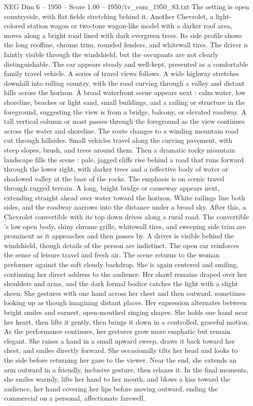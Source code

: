 \begin{textsample}{NEG Dim 6 – 1950 – Score 1.00 – 1950/tv\_com\_1950\_83.txt}
The setting is open countryside, with flat fields stretching behind it.
Another Chevrolet, a light-colored station wagon or two-tone wagon-like model with a darker roof area, moves along a bright road lined with dark evergreen trees.
Its side profile shows the long roofline, chrome trim, rounded fenders, and whitewall tires.
The driver is faintly visible through the windshield, but the occupants are not clearly distinguishable.
The car appears steady and well-kept, presented as a comfortable family travel vehicle.
A series of travel views follows.
A wide highway stretches downhill into rolling country, with the road curving through a valley and distant hills across the horizon.
A broad waterfront scene appears next : calm water, low shoreline, beaches or light sand, small buildings, and a railing or structure in the foreground, suggesting the view is from a bridge, balcony, or elevated roadway.
A tall vertical column or mast passes through the foreground as the view continues across the water and shoreline.
The route changes to a winding mountain road cut through hillsides.
Small vehicles travel along the curving pavement, with steep slopes, brush, and trees around them.
Then a dramatic rocky mountain landscape fills the scene : pale, jagged cliffs rise behind a road that runs forward through the lower right, with darker trees and a reflective body of water or shadowed valley at the base of the rocks.
The emphasis is on scenic travel through rugged terrain.
A long, bright bridge or causeway appears next, extending straight ahead over water toward the horizon.
White railings line both sides, and the roadway narrows into the distance under a broad sky.
After this, a Chevrolet convertible with its top down drives along a rural road.
The convertible ’s low open body, shiny chrome grille, whitewall tires, and sweeping side trim are prominent as it approaches and then passes by.
A driver is visible behind the windshield, though details of the person are indistinct.
The open car reinforces the sense of leisure travel and fresh air.
The scene returns to the woman performer against the soft cloudy backdrop.
She is again centered and smiling, continuing her direct address to the audience.
Her shawl remains draped over her shoulders and arms, and the dark formal bodice catches the light with a slight sheen.
She gestures with one hand across her chest and then outward, sometimes looking up as though imagining distant places.
Her expression alternates between bright smiles and earnest, open-mouthed singing shapes.
She holds one hand near her heart, then lifts it gently, then brings it down in a controlled, graceful motion.
As the performance continues, her gestures grow more emphatic but remain elegant.
She raises a hand in a small upward sweep, draws it back toward her chest, and smiles directly forward.
She occasionally tilts her head and looks to the side before returning her gaze to the viewer.
Near the end, she extends an arm outward in a friendly, inclusive gesture, then relaxes it.
In the final moments, she smiles warmly, lifts her hand to her mouth, and blows a kiss toward the audience, her hand covering her lips before moving outward, ending the commercial on a personal, affectionate farewell.

\end{textsample}
